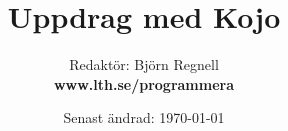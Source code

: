 \documentclass[12pt]{book}
\title{\fontsize{40}{40}\bf\sffamily\selectfont Uppdrag med Kojo
}
\author{Redaktör: Björn Regnell \\ \bf www.lth.se/programmera}
\date{Senast ändrad: \today{ }}
\begin{document}
\maketitle
\newpage
\thispagestyle{empty}



\newpage
\begin{multicols}{3}
\tableofcontents
\mainmatter
\end{multicols}

\fontsize{20}{23}\selectfont\raggedright


\end{document}
